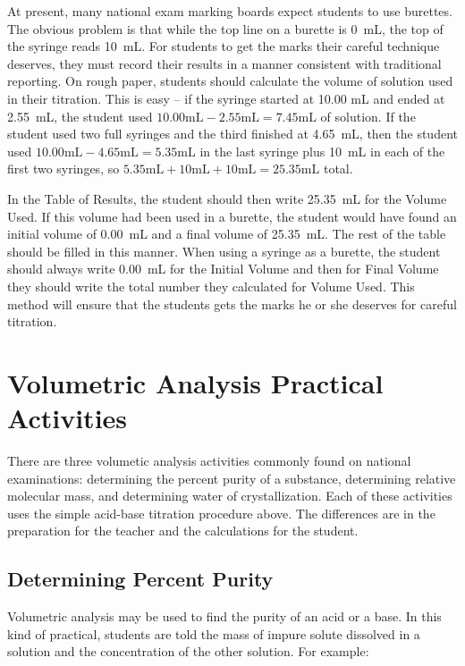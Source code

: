 At present, many national exam marking boards expect students to use burettes. The obvious problem is that while the top line on a burette is 0~mL, the top of the syringe reads 10~mL. For students to get the marks their careful technique deserves, they must record their results in a manner consistent with traditional reporting. On rough paper, students should calculate the volume of solution used in their titration. This is easy -- if the syringe started at 10.00 mL and ended at 2.55~mL, the student used $10.00 \mathrm{mL} - 2.55 \mathrm{mL} = 7.45 \mathrm{mL}$ of solution. If the student used two full syringes and the third finished at 4.65~mL, then the student used $10.00 \mathrm{mL} - 4.65 \mathrm{mL} = 5.35 \mathrm{mL}$ in the last syringe plus 10~mL in each of the first two syringes, so $5.35 \mathrm{mL} + 10 \mathrm{mL} + 10 \mathrm{mL} = 25.35 \mathrm{mL}$ total.

In the Table of Results, the student should then write 25.35~mL for the Volume Used. If this volume had been used in a burette, the student would have found an initial volume of 0.00~mL and a final volume of 25.35~mL. The rest of the table should be filled in this manner. When using a syringe as a burette, the student should always write 0.00~mL for the Initial Volume and then for Final Volume they should write the total number they calculated for Volume Used. This method will ensure that the students gets the marks he or she deserves for careful titration. 

\section{Volumetric Analysis Practical Activities}

There are three volumetic analysis activities commonly found on national examinations: determining the percent purity of a substance, determining relative molecular mass, and determining water of crystallization. Each of these activities uses the simple acid-base titration procedure above. The differences are in the preparation for the teacher and the calculations for the student.

\subsection{Determining Percent Purity}
Volumetric analysis may be used to find the purity of an acid or a base. In this kind of practical, students are told the mass of impure solute dissolved in a solution and the concentration of the other solution. 
For example: 

